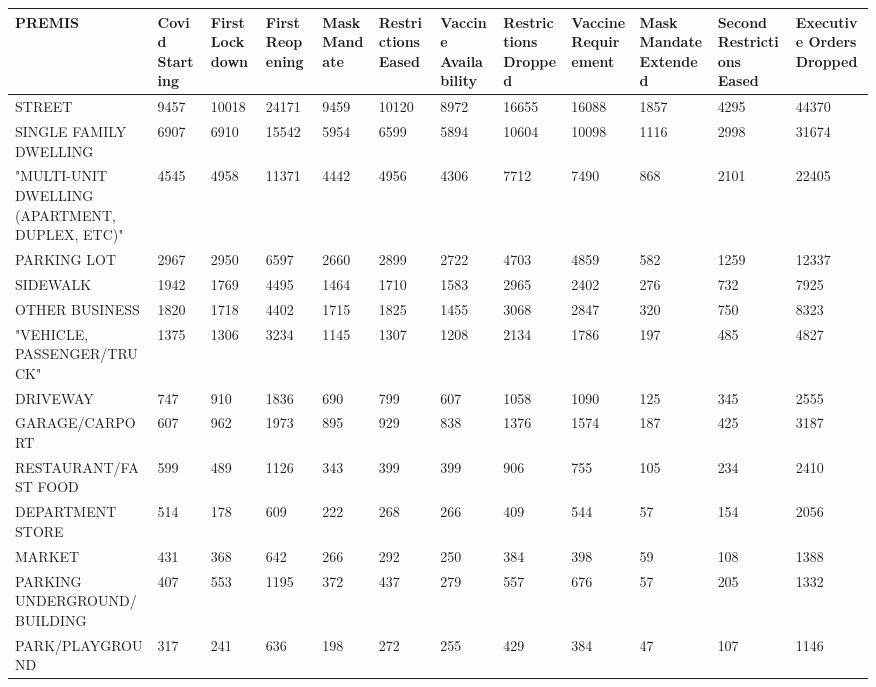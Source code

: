 \documentclass{article}
\begin{document}
\pagestyle{empty}

\begin{landscape}
\begin{table}[!ht]
    \centering
    \small
    \begin{tabular}{|p{2cm}|*{11}{p{1.7cm}|}}
    \hline
        PREMIS & Covid Starting & First Lockdown & First Reopening & Mask Mandate & Restrictions Eased & Vaccine Availability & Restrictions Dropped & Vaccine Requirement & Mask Mandate Extended & Second Restrictions Eased & Executive Orders Dropped \\ \hline
        STREET & 9457 & 10018 & 24171 & 9459 & 10120 & 8972 & 16655 & 16088 & 1857 & 4295 & 44370 \\ \hline
        SINGLE FAMILY DWELLING & 6907 & 6910 & 15542 & 5954 & 6599 & 5894 & 10604 & 10098 & 1116 & 2998 & 31674 \\ \hline
        "MULTI-UNIT DWELLING (APARTMENT, DUPLEX, ETC)" & 4545 & 4958 & 11371 & 4442 & 4956 & 4306 & 7712 & 7490 & 868 & 2101 & 22405 \\ \hline
        PARKING LOT & 2967 & 2950 & 6597 & 2660 & 2899 & 2722 & 4703 & 4859 & 582 & 1259 & 12337 \\ \hline
        SIDEWALK & 1942 & 1769 & 4495 & 1464 & 1710 & 1583 & 2965 & 2402 & 276 & 732 & 7925 \\ \hline
        OTHER BUSINESS & 1820 & 1718 & 4402 & 1715 & 1825 & 1455 & 3068 & 2847 & 320 & 750 & 8323 \\ \hline
        "VEHICLE, PASSENGER/TRUCK" & 1375 & 1306 & 3234 & 1145 & 1307 & 1208 & 2134 & 1786 & 197 & 485 & 4827 \\ \hline
        DRIVEWAY & 747 & 910 & 1836 & 690 & 799 & 607 & 1058 & 1090 & 125 & 345 & 2555 \\ \hline
        GARAGE/CARPORT & 607 & 962 & 1973 & 895 & 929 & 838 & 1376 & 1574 & 187 & 425 & 3187 \\ \hline
        RESTAURANT/FAST FOOD & 599 & 489 & 1126 & 343 & 399 & 399 & 906 & 755 & 105 & 234 & 2410 \\ \hline
        DEPARTMENT STORE & 514 & 178 & 609 & 222 & 268 & 266 & 409 & 544 & 57 & 154 & 2056 \\ \hline
        MARKET & 431 & 368 & 642 & 266 & 292 & 250 & 384 & 398 & 59 & 108 & 1388 \\ \hline
        PARKING UNDERGROUND/BUILDING & 407 & 553 & 1195 & 372 & 437 & 279 & 557 & 676 & 57 & 205 & 1332 \\ \hline
        PARK/PLAYGROUND & 317 & 241 & 636 & 198 & 272 & 255 & 429 & 384 & 47 & 107 & 1146 \\ \hline

\end{tabular}
\end{table}
\end{landscape}
\end{document}
